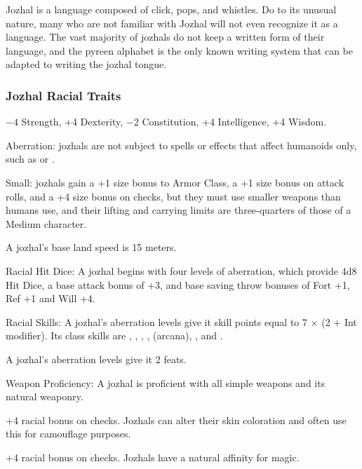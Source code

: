 Jozhal is a language composed of click, pops, and whistles. Do to its unusual nature, many who are not familiar with Jozhal will not even recognize it as a language. The vast majority of jozhals do not keep a written form of their language, and the pyreen alphabet is the only known writing system that can be adapted to writing the jozhal tongue.

\subsubsection{Jozhal Racial Traits}
\begin{itemize*}
    \item $-4$ Strength, +4 Dexterity, $-2$ Constitution, +4 Intelligence, +4 Wisdom.
    \item Aberration: jozhals are not subject to spells or effects that affect humanoids only, such as  or .
    \item Small: jozhals gain a +1 size bonus to Armor Class, a	+1 size bonus on attack rolls, and a +4 size bonus on  checks, but they must use smaller weapons than humans use, and their lifting and carrying limits are three-quarters of those of a Medium character.
    \item A jozhal's base land speed is 15 meters.

    \item Racial Hit Dice: A jozhal begins with four levels of aberration, which provide 4d8 Hit Dice, a base attack bonus of +3, and base saving throw bonuses of Fort +1, Ref +1 and Will +4.
    \item Racial Skills: A jozhal's aberration levels give it skill points equal to 7 $\times$ (2 + Int modifier). Its class skills are , , , ,  (arcana), , and .
    \item A jozhal's aberration levels give it 2 feats.
    \item Weapon Proficiency: A jozhal is proficient with all simple weapons and its natural weaponry.

    \item +4 racial bonus on  checks. Jozhals can alter their skin coloration and often use this for camouflage purposes.
    \item +4 racial bonus on  checks. Jozhals have a natural affinity for magic.


\end{itemize*}
